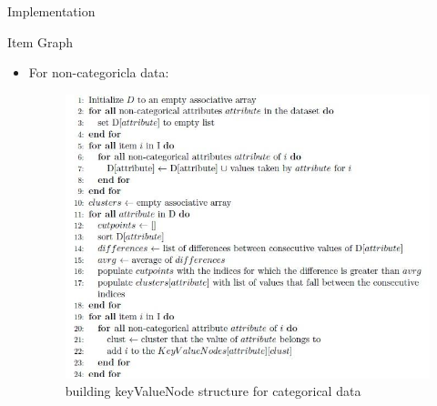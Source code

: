\documentclass{report}
\begin{document}
\begin{projChapter}{Implementation}
\begin{projSection}{Item Graph}
\begin{itemize}
  \item For non-categoricla data:
                    \begin{figure}[ht!]
\centering
\includegraphics[scale=0.6]{images/noncategorical.png}
\caption{building keyValueNode structure for categorical data}
\label{noncategorical}
\end{figure}


\end{itemize}


\end{projSection}
\end{projChapter}
\end{document}
